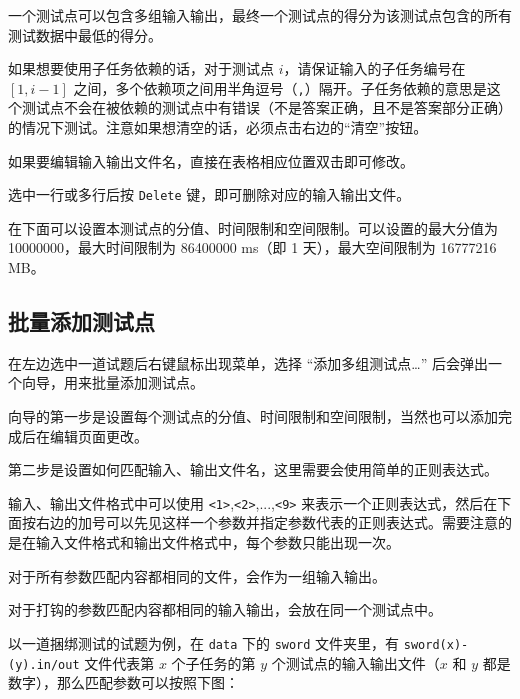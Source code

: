 \documentclass[UTF-8]{ctexart}
\begin{document}
			一个测试点可以包含多组输入输出，最终一个测试点的得分为该测试点包含的所有测试数据中最低的得分。

			如果想要使用子任务依赖的话，对于测试点 $i$，请保证输入的子任务编号在 $[1, i - 1]$ 之间，多个依赖项之间用半角逗号（\texttt{,}）隔开。子任务依赖的意思是这个测试点不会在被依赖的测试点中有错误（不是答案正确，且不是答案部分正确）的情况下测试。注意如果想清空的话，必须点击右边的“清空”按钮。

			如果要编辑输入输出文件名，直接在表格相应位置双击即可修改。

			选中一行或多行后按 \texttt{Delete} 键，即可删除对应的输入输出文件。

			在下面可以设置本测试点的分值、时间限制和空间限制。可以设置的最大分值为 10000000，最大时间限制为 86400000 ms（即 1 天），最大空间限制为 16777216 MB。

		\subsection{批量添加测试点}

			在左边选中一道试题后右键鼠标出现菜单，选择 “添加多组测试点…” 后会弹出一个向导，用来批量添加测试点。

			向导的第一步是设置每个测试点的分值、时间限制和空间限制，当然也可以添加完成后在编辑页面更改。

			第二步是设置如何匹配输入、输出文件名，这里需要会使用简单的正则表达式。

			输入、输出文件格式中可以使用 \texttt{<1>},\texttt{<2>},...,\texttt{<9>} 来表示一个正则表达式，然后在下面按右边的加号可以先见这样一个参数并指定参数代表的正则表达式。需要注意的是在输入文件格式和输出文件格式中，每个参数只能出现一次。

			对于所有参数匹配内容都相同的文件，会作为一组输入输出。

			对于打钩的参数匹配内容都相同的输入输出，会放在同一个测试点中。

			以一道捆绑测试的试题为例，在 \texttt{data} 下的 \texttt{sword} 文件夹里，有 \texttt{sword(x)-(y).in/out} 文件代表第 $x$ 个子任务的第 $y$ 个测试点的输入输出文件（$x$ 和 $y$ 都是数字），那么匹配参数可以按照下图：
\end{document}
